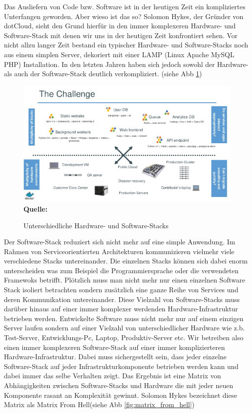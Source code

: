 Das Ausliefern von Code bzw. Software ist in der heutigen Zeit ein kompliziertes Unterfangen geworden. Aber wieso ist das so? Solomon Hykes, der Gründer von dotCloud, sieht den Grund hierfür in den immer komplexeren Hardware- und Software-Stack mit denen wir uns in der heutigen Zeit konfrontiert sehen. \cite{hykes_introduction_2013} 
Vor nicht allzu langer Zeit bestand ein typischer Hardware- und Software-Stacks noch aus einem simplen Server, dekoriert mit einer LAMP (Linux Apache MySQL PHP) Installation.
In den letzten Jahren haben sich jedoch sowohl der Hardware- als auch der Software-Stack deutlich verkompliziert. (siehe Abb \ref{fig:hardware_software_stack}) 
\begin{figure}[htbp]
  \centering  
  \includegraphics[scale=0.5]{img/hardware_software_stack.jpg}\\
  \footnotesize\sffamily\textbf{Quelle:} \cite{hykes_docker_2013}
  \caption{Unterschiedliche Hardware- und Software-Stacks}
  \label{fig:hardware_software_stack}
\end{figure}
Der Software-Stack reduziert sich nicht mehr auf eine simple Anwendung. Im Rahmen von Serviceorientierten Architekturen kommunizieren vielmehr viele verschiedene Stacks untereinander. Die einzelnen Stacks können sich dabei enorm unterscheiden was zum Beispiel die Programmiersprache oder die verwendeten Framewoks betrifft.
Plötzlich muss man nicht mehr nur einen einzelnen Software Stack isoliert betrachten sondern zusätzlich eine ganze Reihe von Services und deren Kommunikation untereinander.
Diese Vielzahl von Software-Stacks muss darüber hinaus auf einer immer komplexer werdenden Hardware-Infrastruktur betrieben werden. Entwickelte Software muss nicht mehr nur auf einem einzigen Server laufen sondern auf einer Vielzahl von unterschiedlicher Hardware wie z.b. Test-Server, Entwicklungs-Pc, Laptop, Produktiv-Server etc.
Wir betreiben also einen immer komplexeren Software-Stack auf einer immer komplizierteren Hardware-Infrastruktur. Dabei muss sichergestellt sein, dass jeder einzelne Software-Stack auf jeder Infrastrukturkomponente betrieben werden kann und dabei immer das selbe Verhalten zeigt.
Das Ergebnis ist eine Matrix von Abhängigkeiten zwischen Software-Stacks und Hardware die mit jeder neuen Komponente rasant an Komplexität gewinnt.
Solomon Hykes bezeichnet diese Matrix als \glqq Matrix From Hell\grqq \cite[Zeit 4:30]{hykes_introduction_2013}(siehe Abb \ref{fig:matrix_from_hell}) 

